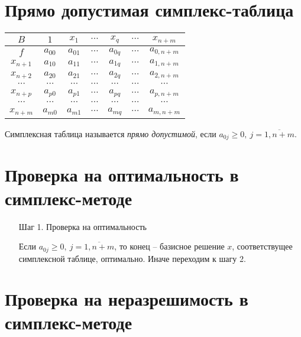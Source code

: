 \section{Прямо допустимая симплекс-таблица}

\begin{center}
	\begin{tabular}{| c | c | c c c c c |}
		\hline
		$B$       & $1$      & $x_1$    & $\cdots$ & $x_q$    & $\cdots$ & $x_{n+m}$   \\
		\hline
		$f$       & $a_{00}$ & $a_{01}$ & $\cdots$ & $a_{0q}$ & $\cdots$ & $a_{0,n+m}$ \\
		\hline
		$x_{n+1}$ & $a_{10}$ & $a_{11}$ & $\cdots$ & $a_{1q}$ & $\cdots$ & $a_{1,n+m}$ \\
		$x_{n+2}$ & $a_{20}$ & $a_{21}$ & $\cdots$ & $a_{2q}$ & $\cdots$ & $a_{2,n+m}$ \\
		$\cdots$  & $\cdots$ & $\cdots$ & $\cdots$ & $\cdots$ & $\cdots$ & $\cdots$    \\
		$x_{n+p}$ & $a_{p0}$ & $a_{p1}$ & $\cdots$ & $a_{pq}$ & $\cdots$ & $a_{p,n+m}$ \\
		$\cdots$  & $\cdots$ & $\cdots$ & $\cdots$ & $\cdots$ & $\cdots$ & $\cdots$    \\
		$x_{n+m}$ & $a_{m0}$ & $a_{m1}$ & $\cdots$ & $a_{mq}$ & $\cdots$ & $a_{m,n+m}$ \\
		\hline
	\end{tabular}
\end{center}

\begin{definition}
	Симплексная таблица называется \emph{прямо допустимой}, если $a_{0j}\geqslant 0, \ j = \overline{1,n+m}$.
\end{definition}

\section{Проверка на оптимальность в симплекс-методе}

\begin{enumerate}
	\item[Шаг 1.] Проверка на оптимальность

	      Если $a_{0j} \geqslant 0, \ j = \overline{1,n+m}$, то конец -- базисное решение $x$, соответствущее симплексной таблице, оптимально. Иначе переходим к шагу 2.
\end{enumerate}

\section{Проверка на неразрешимость в симплекс-методе}

